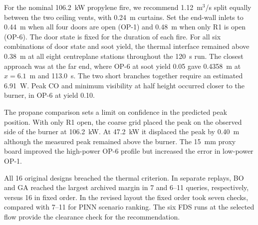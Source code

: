 For the nominal 106.2~kW propylene fire, we recommend 1.12~m$^3$/s split equally between the two ceiling vents, with 0.24~m curtains. Set the end-wall inlets to 0.44~m when all four doors are open (OP-1) and 0.48~m when only R1 is open (OP-6). The door state is fixed for the duration of each fire. For all six combinations of door state and soot yield, the thermal interface remained above 0.38~m at all eight centreplane stations throughout the 120~s run. The closest approach was at the far end, where OP-6 at soot yield 0.05 gave 0.4358~m at $x=6.1$~m and 113.0~s. The two short branches together require an estimated 6.91~W. Peak CO and minimum visibility at half height occurred closer to the burner, in OP-6 at yield 0.10.

The propane comparison sets a limit on confidence in the predicted peak position. With only R1 open, the coarse grid placed the peak on the observed side of the burner at 106.2~kW. At 47.2~kW it displaced the peak by 0.40~m although the measured peak remained above the burner. The 15~mm proxy board improved the high-power OP-6 profile but increased the error in low-power OP-1.

All 16 original designs breached the thermal criterion. In separate replays, BO and GA reached the largest archived margin in 7 and 6--11 queries, respectively, versus 16 in fixed order. In the revised layout the fixed order took seven checks, compared with 7--11 for PINN scenario ranking. The six FDS runs at the selected flow provide the clearance check for the recommendation.
